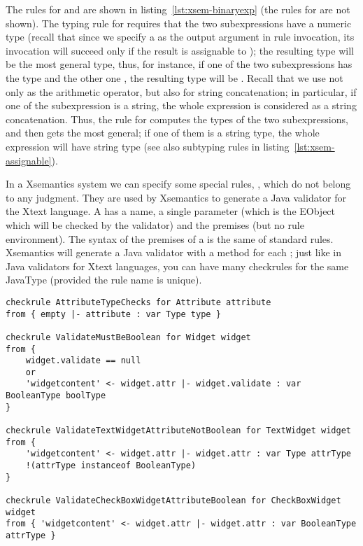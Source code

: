 The rules for  and  are shown in
listing~\ref{lst:xsem-binaryexp} (the rules for  are not
shown).
The typing rule for  requires that the two subexpressions have a
numeric type (recall that since we specify a  as the output
argument in rule invocation, its invocation will succeed only if the result is
assignable to ); the resulting type will be the most general
type, thus, for instance, if one of the two subexpressions has the type
 and the other one , the resulting type will be
.  Recall that we use \mytt{+} not only as the arithmetic
operator, but also for string concatenation; in particular, if one of the
subexpression is a string, the whole expression is considered as a string
concatenation.  Thus, the rule for  computes the types of the two
subexpressions, and then gets the most general; if one of them is a string type,
the whole expression will have string type (see also subtyping rules in
listing~\ref{lst:xsem-assignable}).


In a Xsemantics system we can specify some special rules,
, which do not belong to any judgment. They are used by
Xsemantics to generate a Java validator for the Xtext language.  A
 has a name, a single parameter (which is the EObject which will
be checked by the validator) and the premises (but no rule environment).  The
syntax of the premises of a  is the same of standard rules.
Xsemantics will generate a Java validator with a \checkm{} method for each
; just like in Java validators for Xtext languages, you can have
many checkrules for the same JavaType (provided the rule name is unique).

\begin{lstlisting}[language=xsemantics,float,label=lst:xsem-validator,caption=Some
checkrules for the Validator.] 
checkrule AttributeTypeChecks for Attribute attribute
from { empty |- attribute : var Type type }

checkrule ValidateMustBeBoolean for Widget widget
from {
	widget.validate == null
	or 
	'widgetcontent' <- widget.attr |- widget.validate : var BooleanType boolType
}

checkrule ValidateTextWidgetAttributeNotBoolean for TextWidget widget
from {
	'widgetcontent' <- widget.attr |- widget.attr : var Type attrType
	!(attrType instanceof BooleanType)
}

checkrule ValidateCheckBoxWidgetAttributeBoolean for CheckBoxWidget widget
from { 'widgetcontent' <- widget.attr |- widget.attr : var BooleanType attrType }
\end{lstlisting}

